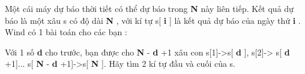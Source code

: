 Một cái máy dự báo thời tiết có thể dự báo trong   \textbf{    N   }   này liên tiếp. Kết quả dự báo là một xâu s có độ dài   \textbf{    N   }   , với kí tự s[   \textbf{    i   }   ] là kết quả dự báo của ngày thứ   \textbf{    i   }   . Wind có 1 bài toán cho các bạn :  

   Với 1 số   \textbf{    d   }   cho trước, bạn được cho   \textbf{    N   }   -   \textbf{    d   }   +1 xâu con s[1]->s[   \textbf{    d   }   ], s[2]-> s[   \textbf{    d   }   +1]... s[   \textbf{    N   }   -   \textbf{    d   }   +1]->s[   \textbf{    N   }   ]. Hãy tìm 2 kí tự đầu và cuối của s.